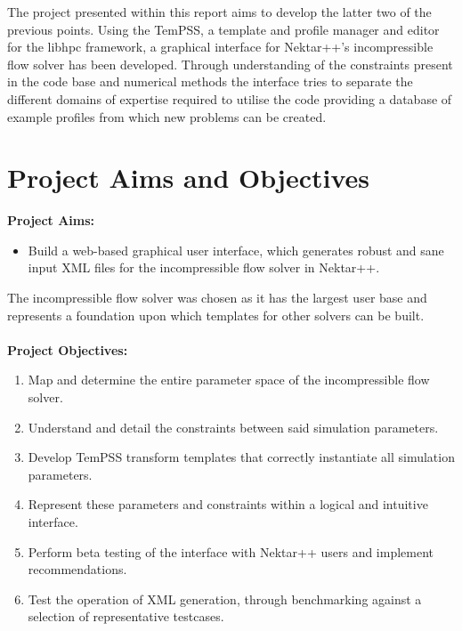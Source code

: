 \documentclass[11pt, a4paper]{report}
\begin{document}
The project presented within this report aims to develop the latter two of the previous points. Using the TemPSS\cite{Austing_etal2017}, a template and profile manager and editor for the libhpc framework, a graphical interface for Nektar++'s incompressible flow solver has been developed. Through understanding of the constraints present in the code base and numerical methods the interface tries to separate the different domains of expertise required to utilise the code providing a database of example profiles from which new problems can be created.
\newpage

\chapter{Project Aims and Objectives}
\label{chap:proj_spec}
\textbf{Project Aims:}
\begin{itemize}
\item Build a web-based graphical user interface, which generates robust and sane input XML files for the incompressible flow solver in Nektar++.
\end{itemize}

The incompressible flow solver was chosen as it has the largest user base and represents a foundation upon which templates for other solvers can be built.
\\ \vspace{.25cm} \\
\textbf{Project Objectives:}
\begin{enumerate}
\item Map and determine the entire parameter space of the incompressible flow solver.
\item Understand and detail the constraints between said simulation parameters.
\item Develop TemPSS transform templates that correctly instantiate all simulation parameters.
\item Represent these parameters and constraints within a logical and intuitive interface.
\item Perform beta testing of the interface with Nektar++ users and implement recommendations.
\item Test the operation of XML generation, through benchmarking against a selection of representative testcases.
\end{enumerate}
\end{document}
